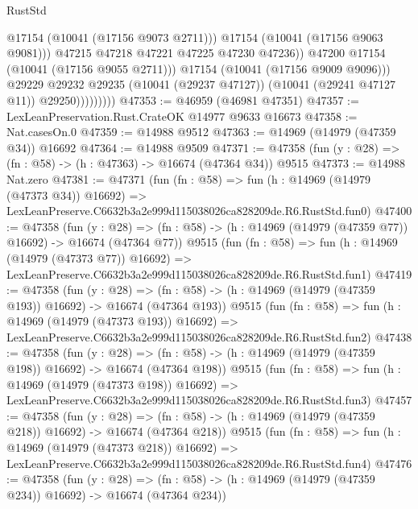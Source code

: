 \begin{lexlean}{RustStd}
\begin{coremodule}
                                  @17154
                                  (@10041 (@17156 @9073 @2711)))
                                @17154
                                (@10041 (@17156 @9063 @9081)))
                              @47215
                              @47218
                              @47221
                              @47225
                              @47230
                              @47236))
                          @47200
                          @17154
                          (@10041 (@17156 @9055 @2711)))
                        @17154
                        (@10041 (@17156 @9009 @9096)))
                      @29229
                      @29232
                      @29235
                      (@10041 (@29237 @47127))
                      (@10041 (@29241 @47127 @11))
                      @29250)))))))))
@47353 := @46959 (@46981 @47351)
@47357 := LexLeanPreservation.Rust.CrateOK @14977 @9633 @16673
@47358 := Nat.casesOn.{0}
@47359 := @14988 @9512
@47363 := @14969 (@14979 (@47359 @34)) @16692
@47364 := @14988 @9509
@47371 := @47358 (fun (y : @28) => (fn : @58) -> (h : @47363) -> @16674 (@47364 @34)) @9515
@47373 := @14988 Nat.zero
@47381 := @47371
    (fun (fn : @58) =>
    fun (h : @14969 (@14979 (@47373 @34)) @16692) =>
    LexLeanPreserve.C6632b3a2e999d115038026ca828209de.R6.RustStd.fun0)
@47400 := @47358
    (fun (y : @28) =>
    (fn : @58) -> (h : @14969 (@14979 (@47359 @77)) @16692) -> @16674 (@47364 @77))
    @9515
    (fun (fn : @58) =>
    fun (h : @14969 (@14979 (@47373 @77)) @16692) =>
    LexLeanPreserve.C6632b3a2e999d115038026ca828209de.R6.RustStd.fun1)
@47419 := @47358
    (fun (y : @28) =>
    (fn : @58) -> (h : @14969 (@14979 (@47359 @193)) @16692) -> @16674 (@47364 @193))
    @9515
    (fun (fn : @58) =>
    fun (h : @14969 (@14979 (@47373 @193)) @16692) =>
    LexLeanPreserve.C6632b3a2e999d115038026ca828209de.R6.RustStd.fun2)
@47438 := @47358
    (fun (y : @28) =>
    (fn : @58) -> (h : @14969 (@14979 (@47359 @198)) @16692) -> @16674 (@47364 @198))
    @9515
    (fun (fn : @58) =>
    fun (h : @14969 (@14979 (@47373 @198)) @16692) =>
    LexLeanPreserve.C6632b3a2e999d115038026ca828209de.R6.RustStd.fun3)
@47457 := @47358
    (fun (y : @28) =>
    (fn : @58) -> (h : @14969 (@14979 (@47359 @218)) @16692) -> @16674 (@47364 @218))
    @9515
    (fun (fn : @58) =>
    fun (h : @14969 (@14979 (@47373 @218)) @16692) =>
    LexLeanPreserve.C6632b3a2e999d115038026ca828209de.R6.RustStd.fun4)
@47476 := @47358
    (fun (y : @28) =>
    (fn : @58) -> (h : @14969 (@14979 (@47359 @234)) @16692) -> @16674 (@47364 @234))

\end{coremodule}
\end{lexlean}
